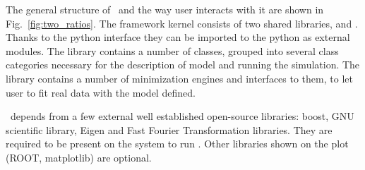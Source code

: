The general structure of \BornAgain\ and the way user interacts with it are
shown in Fig.~\ref{fig:two_ratios}.
The framework kernel consists of two shared libraries,  and
. Thanks to the python interface they can be imported to the python as external modules. The library  contains a number of classes, grouped into several class categories necessary for the description of model and running the simulation.
The library   contains a number of minimization engines 
and interfaces to them, to let user to fit real data with the model defined.

\BornAgain\ depends from a few external well established open-source libraries: boost, GNU scientific library, Eigen and Fast Fourier Transformation libraries. They are required to be present on the system to run \BornAgain . Other libraries shown
on the plot (ROOT, matplotlib) are optional.

 







